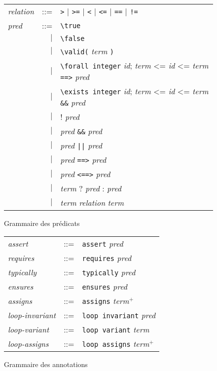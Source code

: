 \begin{figure}[tb]
  \begin{tabular}{lrl}
    \textit{relation} & ::= & \lstinline'>' $\mid$ \lstinline'>=' $\mid$
    \lstinline'<' $\mid$ \lstinline'<=' $\mid$ \lstinline'==' $\mid$
    \lstinline'!=' \\
    \textit{pred} & ::= & \lstinline'\true' \\
    & $\mid$ & \lstinline'\false' \\
    & $\mid$ & \lstinline'\valid(' \textit{term} \lstinline')' \\
    & $\mid$ & \lstinline'\forall integer' \textit{id};
    \textit{term} <= \textit{id} <= \textit{term}
    \lstinline'==>' \textit{pred} \\
    & $\mid$ & \lstinline'\exists integer' \textit{id};
    \textit{term} <= \textit{id} <= \textit{term}
    \lstinline'&&' \textit{pred} \\
    & $\mid$ & ! \textit{pred} \\
    & $\mid$ & \textit{pred} \lstinline'&&' \textit{pred} \\
    & $\mid$ & \textit{pred} \lstinline'||' \textit{pred} \\
    & $\mid$ & \textit{pred} \lstinline'==>' \textit{pred} \\
    & $\mid$ & \textit{pred} \lstinline'<==>' \textit{pred} \\
    & $\mid$ & \textit{term} ? \textit{pred} : \textit{pred} \\
    & $\mid$ & \textit{term} \textit{relation} \textit{term} \\
  \end{tabular}
  \caption{Grammaire des prédicats \eacsl}
  \label{fig:gram-pred}
\end{figure}

\begin{figure}[tb]
  \begin{tabular}{lrl}
    \textit{assert} & ::= & \lstinline'assert' \textit{pred} \\
    \textit{requires} & ::= & \lstinline'requires' \textit{pred} \\
    \textit{typically} & ::= & \lstinline'typically' \textit{pred} \\
    \textit{ensures} & ::= & \lstinline'ensures' \textit{pred} \\
    \textit{assigns} & ::= & \lstinline'assigns' \textit{term}$^{+}$ \\
    \textit{loop-invariant} & ::= & \lstinline'loop invariant' \textit{pred} \\
    \textit{loop-variant} & ::= & \lstinline'loop variant' \textit{term} \\
    \textit{loop-assigns} & ::= & \lstinline'loop assigns' \textit{term}$^{+}$
  \end{tabular}
  \caption{Grammaire des annotations \eacsl}
  \label{fig:gram-annot}
\end{figure}

